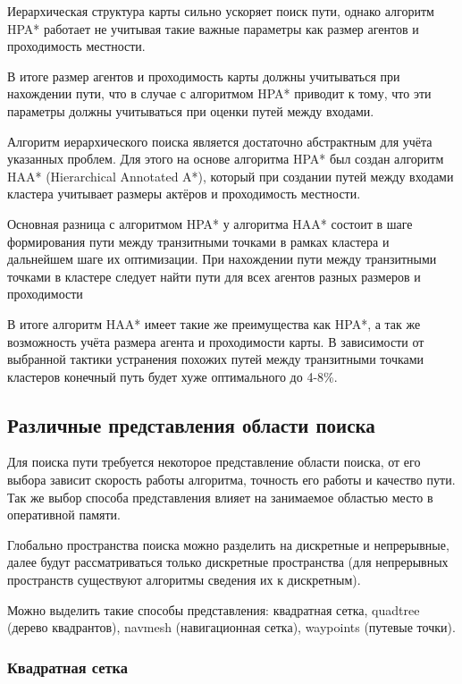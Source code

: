 Иерархическая структура карты сильно ускоряет поиск пути, однако алгоритм HPA* работает не учитывая такие важные параметры как размер агентов и проходимость местности.  

В итоге размер агентов и проходимость карты должны учитываться при нахождении пути, что в случае с алгоритмом HPA* приводит к тому, что эти параметры должны учитываться при оценки путей между входами.

Алгоритм иерархического поиска является достаточно абстрактным для учёта указанных проблем. Для этого на основе алгоритма HPA* был создан алгоритм HAA* (Hierarchical Annotated A*), который при создании путей между входами кластера учитывает размеры актёров и проходимость местности.

Основная разница с алгоритмом HPA* у алгоритма HAA* состоит в шаге формирования пути между транзитными точками в рамках кластера и дальнейшем шаге их оптимизации. При нахождении пути между транзитными точками в кластере следует найти пути для всех агентов разных размеров и проходимости 

В итоге алгоритм HAA* имеет такие же преимущества как HPA*, а так же возможность учёта размера агента и проходимости карты. В зависимости от выбранной тактики устранения похожих путей между транзитными точками кластеров конечный путь будет хуже оптимального до 4-8\%.


\subsection{Различные представления области поиска}

Для поиска пути требуется некоторое представление области поиска, от его выбора зависит скорость работы алгоритма, точность его работы и качество пути. Так же выбор способа представления влияет на занимаемое областью место в оперативной памяти. 

Глобально пространства поиска можно разделить на дискретные и непрерывные, далее будут рассматриваться только дискретные пространства (для непрерывных пространств существуют алгоритмы сведения их к дискретным).  

Можно выделить такие способы представления: квадратная сетка, quadtree (дерево квадрантов), navmesh (навигационная сетка), waypoints (путевые точки).

\subsubsection{Квадратная сетка}

